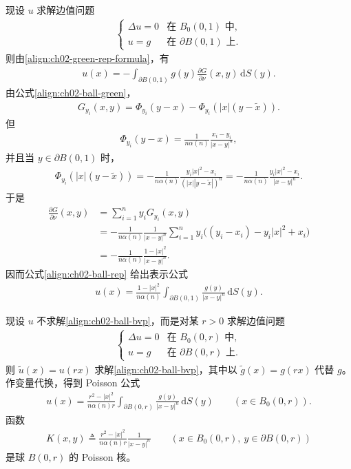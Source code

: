 \documentclass[../../main.tex]{subfiles}
\begin{document}
现设 $u$ 求解边值问题
\begin{align}\label{align:ch02-ball-bvp}
\begin{cases}
\Delta u=0 & \text{在 }B_0(0,1)\text{ 中},\\
u=g & \text{在 }\partial B(0,1)\text{ 上}.
\end{cases}
\end{align}
则由\eqref{align:ch02-green-rep-formula}，有
\begin{align}\label{align:ch02-ball-rep}
u(x)=-\int_{\partial B(0,1)}g(y)\frac{\partial G}{\partial\nu}(x,y)\,\mathrm{d}S(y).
\end{align}
由公式\eqref{align:ch02-ball-green}，
\begin{align*}
G_{y_i}(x,y)=\Phi_{y_i}(y-x)-\Phi_{y_i}(|x|(y-\widetilde{x})).
\end{align*}
但
\begin{align*}
\Phi_{y_i}(y-x)=\frac{1}{n\alpha(n)}\frac{x_i-y_i}{|x-y|^n},
\end{align*}
并且当 $y\in\partial B(0,1)$ 时，
\begin{align*}
\Phi_{y_i}(|x|(y-\widetilde{x}))=-\frac{1}{n\alpha(n)}\frac{y_i|x|^2-x_i}{(|x||y-\widetilde{x}|)^n}=-\frac{1}{n\alpha(n)}\frac{y_i|x|^2-x_i}{|x-y|^n}.
\end{align*}
于是
\begin{align*}
\frac{\partial G}{\partial\nu}(x,y)&=\sum_{i=1}^n y_i G_{y_i}(x,y)\\
&=-\frac{1}{n\alpha(n)}\frac{1}{|x-y|^n}\sum_{i=1}^n y_i\big((y_i-x_i)-y_i|x|^2+x_i\big)\\
&=-\frac{1}{n\alpha(n)}\frac{1-|x|^2}{|x-y|^n}.
\end{align*}
因而公式\eqref{align:ch02-ball-rep} 给出表示公式
\begin{align*}
u(x)=\frac{1-|x|^2}{n\alpha(n)}\int_{\partial B(0,1)}\frac{g(y)}{|x-y|^n}\,\mathrm{d}S(y).
\end{align*}

现设 $u$ 不求解\eqref{align:ch02-ball-bvp}，而是对某 $r>0$ 求解边值问题
\begin{align}\label{align:ch02-ball-r-bvp}
\begin{cases}
\Delta u=0 & \text{在 }B_0(0,r)\text{ 中},\\
u=g & \text{在 }\partial B(0,r)\text{ 上}.
\end{cases}
\end{align}
则 $\widetilde{u}(x)=u(rx)$ 求解\eqref{align:ch02-ball-bvp}，其中以 $\widetilde{g}(x)=g(rx)$ 代替 $g$。作变量代换，得到 Poisson 公式
\begin{align}\label{align:ch02-poisson-ball}
u(x)=\frac{r^2-|x|^2}{n\alpha(n)r}\int_{\partial B(0,r)}\frac{g(y)}{|x-y|^n}\,\mathrm{d}S(y) \qquad (x\in B_0(0,r)).
\end{align}
函数
\begin{align*}
K(x,y)\triangleq\frac{r^2-|x|^2}{n\alpha(n)r}\frac{1}{|x-y|^n} \qquad (x\in B_0(0,r),\ y\in\partial B(0,r))
\end{align*}
是球 $B(0,r)$ 的 Poisson 核。
\end{document}
